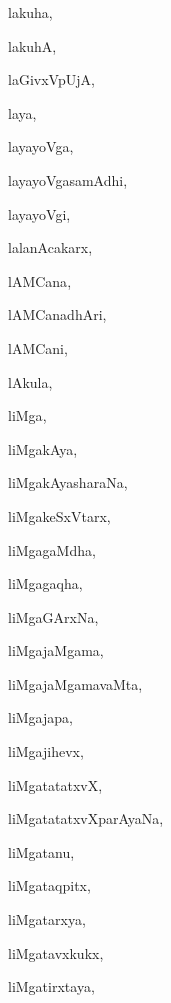 \begin{multicols}{3}
{\noindent
{lakuha}, \pageref{lakuha}

\noindent
{lakuhA}, \pageref{lakuhA}

\noindent
{laGivxVpUjA}, \pageref{laGivxVpUjA}

\noindent
{laya}, \pageref{laya}

\noindent
{layayoVga}, \pageref{layayoVga}

\noindent
{layayoVgasamAdhi}, \pageref{layayoVgasamAdhi}

\noindent
{layayoVgi}, \pageref{layayoVgi}

\noindent
{lalanAcakarx}, \pageref{lalanAcakarx}

\noindent
{lAMCana}, \pageref{lAMCana}

\noindent
{lAMCanadhAri}, \pageref{lAMCanadhAri}

\noindent
{lAMCani}, \pageref{lAMCani}

\noindent
{lAkula}, \pageref{lAkula}

\noindent
{liMga}, \pageref{liMga}

\noindent
{liMgakAya}, \pageref{liMgakAya}

\noindent
{liMgakAyasharaNa}, \pageref{liMgakAyasharaNa}

\noindent
{liMgakeSxVtarx}, \pageref{liMgakeSxVtarx}

\noindent
{liMgagaMdha}, \pageref{liMgagaMdha}

\noindent
{liMgagaqha}, \pageref{liMgagaqha}

\noindent
{liMgaGArxNa}, \pageref{liMgaGArxNa}

\noindent
{liMgajaMgama}, \pageref{liMgajaMgama}

\noindent
{liMgajaMgamavaMta}, \pageref{liMgajaMgamavaMta}

\noindent
{liMgajapa}, \pageref{liMgajapa}

\noindent
{liMgajihevx}, \pageref{liMgajihevx}

\noindent
{liMgatatatxvX}, \pageref{liMgatatatxvX}

\noindent
{liMgatatatxvXparAyaNa}, \pageref{liMgatatatxvXparAyaNa}

\noindent
{liMgatanu}, \pageref{liMgatanu}

\noindent
{liMgataqpitx}, \pageref{liMgataqpitx}

\noindent
{liMgatarxya}, \pageref{liMgatarxya}

\noindent
{liMgatavxkukx}, \pageref{liMgatavxkukx}

\noindent
{liMgatirxtaya}, \pageref{liMgatirxtaya}

}
\end{multicols}
